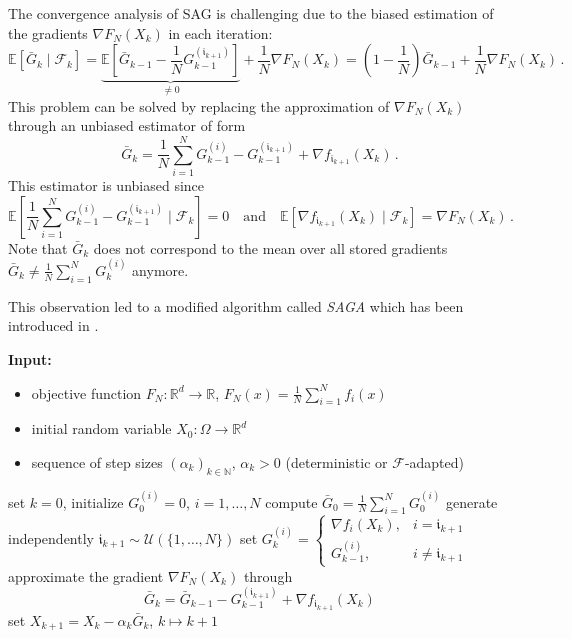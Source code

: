\documentclass[12pt,openany]{book}
\theoremstyle{definition}
\theoremstyle{definition}
\newcommand{\cF}{\mathcal{F}}
\newcommand{\E}{\mathbb{E}}
\newcommand{\N}{\mathbb{N}}
\newcommand{\R}{\mathbb{R}}
\begin{document}
The convergence analysis of SAG is challenging due to the biased estimation of the gradients $\nabla F_N(X_k)$ in each iteration:
\[ \E[\bar G_{k}\mid\cF_k] = \underbrace{\E[\bar G_{k-1} - \frac{1}{N}G_{k-1}^{(\mathfrak i_{k+1})}]}_{\neq0} + \frac1N \nabla F_N(X_k) = (1-\frac1N) \bar G_{k-1} + \frac1N \nabla F_N(X_k)\,.\]
This problem can be solved by replacing the approximation of $\nabla F_N(X_k)$ through an unbiased estimator of form
\[\bar G_k = \frac1N\sum_{i=1}^N G_{k-1}^{(i)} - G_{k-1}^{(\mathfrak i_{k+1})} +\nabla f_{\mathfrak i_{k+1}}(X_k)\,.\]
This estimator is unbiased since 
\[\E[\frac1N\sum_{i=1}^N G_{k-1}^{(i)} - G_{k-1}^{(\mathfrak i_{k+1})}\mid \cF_k] = 0\quad\text{and}\quad \E[\nabla f_{\mathfrak i_{k+1}}(X_k)\mid\cF_k] = \nabla F_N(X_k)\,.\]
Note that $\bar G_k$ does not correspond to the mean over all stored gradients $\bar G_k \neq \frac{1}{N}\sum_{i=1}^N G_{k}^{(i)}$ anymore. 

This observation led to a modified algorithm called \textit{SAGA} which has been introduced in \cite{NIPS2014_ede7e2b6}.

\begin{algorithm}[htb!]
\begin{algorithmic}[1]
\State \textbf{Input:} \begin{itemize}
 \item objective function $F_N:\R^d\to\R$, $F_N(x) = \frac1N\sum_{i=1}^N f_i(x)$
 \item initial random variable $X_0:\Omega\to\R^d$
 \item sequence of step sizes $(\alpha_k)_{k\in\N}$, $\alpha_k>0$ (deterministic or $\mathcal F$-adapted)
 \end{itemize}
 \State set $k=0$, initialize $G_0^{(i)}=0$, $i=1,\dots,N$
 \State compute $\bar G_0 = \frac{1}{N} \sum_{i=1}^N G_0^{(i)}$
	\State generate independently $\mathfrak i_{k+1} \sim \mathcal U(\{1,\dots,N\})$
	\State set $G_k^{(i)} = \begin{cases} \nabla f_i(X_k), & i = \mathfrak i_{k+1} \\ G_{k-1}^{(i)}, & i \neq \mathfrak i_{k+1} \end{cases}$
	\State approximate the gradient $\nabla F_N(X_k)$ through 
	\[\bar G_k = \bar G_{k-1} - G_{k-1}^{(\mathfrak i_{k+1})} + \nabla f_{\mathfrak i_{k+1}}(X_k) 
    \]
	\State set $X_{k+1} = X_k -\alpha_k \bar G_k$, $k \mapsto k+1$
\EndWhile
\end{algorithmic}
 \caption{SAGA}\label{alg:SAGA}
\end{algorithm}
\end{document}
